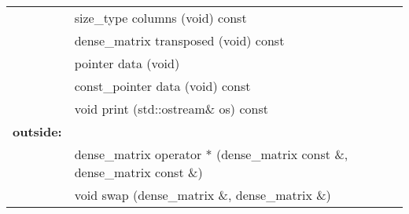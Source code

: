 \begin{table}[H]
\begin{tabular}{ll}
    & size\_type columns (void) const \\
    & dense\_matrix transposed (void) const \\
    & pointer data (void) \\
    & const\_pointer data (void) const \\
    & void print (std::ostream\& os) const \\
    \hline
    \textbf{outside:} & \\
    & dense\_matrix operator * (dense\_matrix const \&, dense\_matrix const \&) \\
    & void swap (dense\_matrix \&, dense\_matrix \&) \\
    \hline
    \end{tabular}
\end{table}

\newpage

